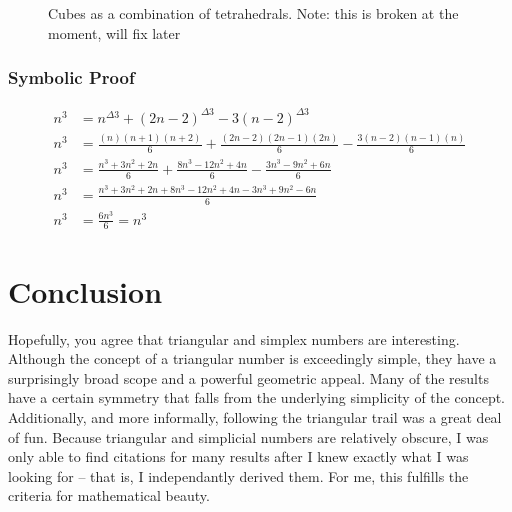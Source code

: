 \documentclass{article}
\newcommand{\tri}[2] {#1^{\Delta #2}}
\begin{document}
\begin{figure}[H]
\centering

\caption{Cubes as a combination of tetrahedrals. Note: this is broken at the moment, will fix later}
\end{figure}
 
 \subsubsection*{Symbolic Proof}
 
 \begin{align*}
 n^3 &= \tri{n}{3} + \tri{(2n-2)}{3} - 3 \tri{(n-2)}{3}\\
 n^3 &= \frac{(n)(n+1)(n+2)}{6} + \frac{(2n-2)(2n-1)(2n)}{6} - \frac{3(n-2)(n-1)(n)}{6}\\
n^3 &= \frac{n^3 + 3n^2 + 2n}{6} + \frac{ 8n^3 - 12n^2 + 4n}{6} - \frac{3n^3 - 9n^2 + 6n}{6}\\
 n^3 &= \frac{n^3 + 3n^2 + 2n + 8n^3 - 12n^2 + 4n - 3n^3 + 9n^2 - 6n}{6}\\
 n^3 &= \frac{6n^3}{6} = n^3
 \end{align*}
 
 \section{Conclusion}

Hopefully, you agree that triangular and simplex numbers are interesting. Although the concept of a triangular number is exceedingly simple, they have a surprisingly broad scope and a powerful geometric appeal. Many of the results have a certain symmetry that falls from the underlying simplicity of the concept. Additionally, and more informally, following the triangular trail was a great deal of fun. Because triangular and simplicial numbers are relatively obscure, I was only able to find citations for many results after I knew exactly what I was looking for -- that is, I independantly derived them. For me, this fulfills the criteria for mathematical beauty.
\end{document}
